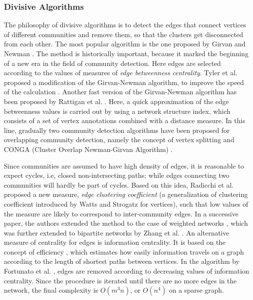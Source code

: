 \subsubsection*{Divisive Algorithms}
The philosophy of divisive algorithms is to detect the edges that connect vertices of different communities and remove them, so that the
clusters get disconnected from each other. The most popular algorithm is the one proposed by Girvan and Newman \cite{ng2002}. The
method is
historically important, because it marked the beginning of a new era in the field of community detection. Here edges are selected according
to the values of measures of {\em edge betweenness centrality}. Tyler et al. proposed a modification of the Girvan-Newman algorithm, to
improve the speed of the calculation \cite{gcalda:TWH03}. Another fast version of the Girvan-Newman algorithm has been proposed by Rattigan
et al. \cite{Rattigan:2007}. Here,
a quick approximation of the edge betweenness values is carried out by using a network structure index, which consists of a set of vertex
annotations combined with a distance measure. 
In this line, gradually two community detection algorithms have been proposed for overlapping community
detection, namely the concept of vertex splitting \cite{PinWes06} and CONGA (Cluster Overlap Newman-Girvan Algorithm) \cite{Gregory:2007}.

Since communities are assumed to have high density of edges, it is reasonable to expect cycles, i.e, closed non-intersecting paths; while
edges connecting two communities will hardly be part of cycles. Based on this idea, Radicchi et al. \cite{radicchi} proposed a new
measure, {\em edge clustering coefficient} (a generalization of clustering coefficient introduced by Watts and Strogatz \cite{Watts-1998}
for
vertices), such that low values of the measure are likely to correspond to inter-community edges. In a successive paper, the authors
extended the method to the case of weighted networks \cite{Castellano04}, which was further extended to
bipartite networks by Zhang et al. \cite{ZhaWanZha07}. An alternative measure of centrality for edges is information centrality. It is based
on the concept of efficiency \cite{PhysRevLett.87.198701}, which estimates how easily information travels on a graph according to the
length of shortest paths between vertices. In the algorithm by Fortunato et al. \cite{ForLatMar04} , edges are removed according to
decreasing values of information centrality. Since the procedure is iterated until there are no more edges in the network, the final
complexity is $O(m^3n)$, or $O(n^4)$ on a sparse graph.
\fi

